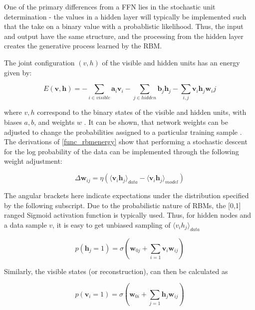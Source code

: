 \documentclass[a4paper,11pt,oneside]{article}
\theoremstyle{plain}
\theoremstyle{definition}
\begin{document}
	One of the primary differences from a FFN lies in the stochastic unit determination - the values in a hidden layer will typically be implemented such that the take on a binary value with a probablistic likelihood. Thus, the input and output have the same structure, and the processing from the hidden layer creates the generative process learned by the RBM. \newline
	
	The joint configuration $(v,h)$ of the visible and hidden units has an energy given by:
	
	\begin{equation}\label{func_rbmenergy}
	E(\mathbf{v},\mathbf{h}) = - \sum_{i \in visible} \mathbf{a}_i\mathbf{v}_i - \sum_{j \in hidden} \mathbf{b}_j\mathbf{h}_j - \sum_{i,j}\mathbf{v}_i\mathbf{h}_j\mathbf{w}_ij
	\end{equation}
	
	where $v,h$ correspond to the binary states of the visible and hidden units, with biases $a,b$, and weights $w$ \cite{Hinton5}. It can be shown, that network weights can be adjusted to change the probabilities assigned to a particular training sample \cite{Hinton5}. The derivations of \ref{func_rbmenergy} show that performing a stochastic descent for the log probability of the data can be implemented through the following weight adjustment:
	
	\begin{equation}
	\Delta \mathbf{w}_{ij} = \eta (\langle \mathbf{v}_i\mathbf{h}_j\rangle_{data} - \langle \mathbf{v}_i\mathbf{h}_j\rangle_{model})
	\end{equation}
	
	The angular brackets here indicate expectations under the distribution specified by the following subscript. Due to the probabilistic nature of RBMs, the [0,1] ranged Sigmoid activation function is typically used. Thus, for hidden nodes and a data sample $v$, it is easy to get unbiased sampling of $\langle v_ih_j \rangle_{data}$
	
	\begin{equation}
	p(\mathbf{h}_j=1) = \sigma(\mathbf{w}_{0j} +  \sum_{i=1}\mathbf{v}_i\mathbf{w}_{ij})
	\end{equation}
	
	Similarly, the visible states (or reconstruction), can then be calculated as 
	
	\begin{equation}
	p(\mathbf{v}_i=1) = \sigma(\mathbf{w}_{0i} + \sum_{j=1}\mathbf{h}_j\mathbf{w}_{ij})
	\end{equation}
	
\end{document}
